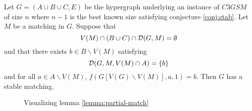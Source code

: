\begin{lemma} \label{lemma:partial-match}Let $G=(A\cup B \cup C, E)$ be the hypergraph underlying an instance of $C3GSM$ of size $n$ where $n-1$ is the best known size satisfying conjecture \ref{conj:stab}. Let $M$ be a matching in $G$. Suppose that
$$ V(M) \cap (B \cup C) \cap \mathcal{D}(G,M) = \emptyset$$
and that there exists $b \in B\backslash V(M)$ satisfying
$$ \mathcal{D}(G, M, V(M) \cap A)  = \{b\}$$
and for all $a \in A \backslash V(M)$, $f(G[V(G)\backslash V(M)], a, 1) = b$. Then $G$ has a stable matching.
\end{lemma}
\begin{figure}[h]
\centering
{}
\caption{Visualizing lemma \ref{lemma:partial-match}}
\end{figure}

